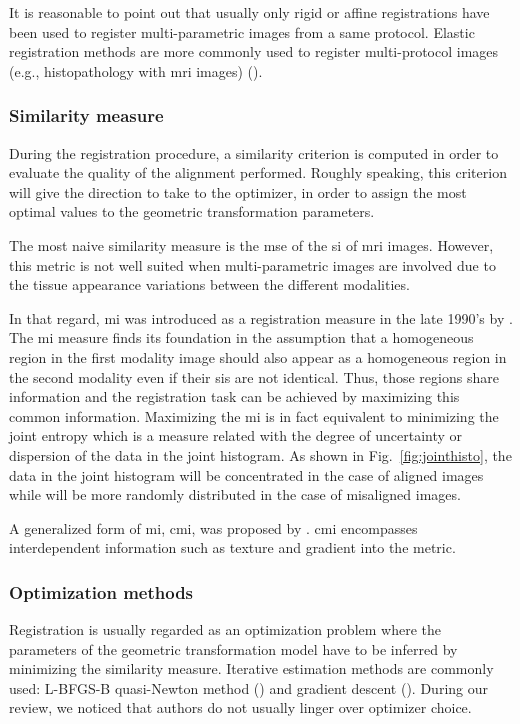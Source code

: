 It is reasonable to point out that usually only rigid or affine registrations have been used to register multi-parametric images from a same protocol. Elastic registration methods are more commonly used to register multi-protocol images (e.g., histopathology with \ac{mri} images) (\cite{Toth2008,Toth2009}).

\subsubsection{Similarity measure}\label{subsubsec:simmea}

During the registration procedure, a similarity criterion is computed in order to evaluate the quality of the alignment performed. Roughly speaking, this criterion will give the direction to take to the optimizer, in order to assign the most optimal values to the geometric transformation parameters.

The most naive similarity measure is the \acf{mse} of the \ac{si} of \ac{mri} images. However, this metric is not well suited when multi-parametric images are involved due to the tissue appearance variations between the different modalities.

In that regard, \ac{mi} was introduced as a registration measure in the late 1990's by \cite{Pluim2003}. The \ac{mi} measure finds its foundation in the assumption that a homogeneous region in the first modality image should also appear as a homogeneous region in the second modality even if their \acp{si} are not identical. Thus, those regions share information and the registration task can be achieved by maximizing this common information. Maximizing the \ac{mi} is in fact equivalent to minimizing the joint entropy which is a measure related with the degree of uncertainty or dispersion of the data in the joint histogram. As shown in Fig.~\ref{fig:jointhisto}, the data in the joint histogram will be concentrated in the case of aligned images while will be more randomly distributed in the case of misaligned images.

A generalized form of \ac{mi}, \ac{cmi}, was proposed by \cite{Chappelow2011}. \ac{cmi} encompasses interdependent information such as texture and gradient into the metric.

\subsubsection{Optimization methods}\label{subsubsec:optmea}

Registration is usually regarded as an optimization problem where the parameters of the geometric transformation model have to be inferred by minimizing the similarity measure. Iterative estimation methods are commonly used: L-BFGS-B quasi-Newton method (\cite{Byrd1995}) and gradient descent (\cite{Viola1997}). During our review, we noticed that authors do not usually linger over optimizer choice.

